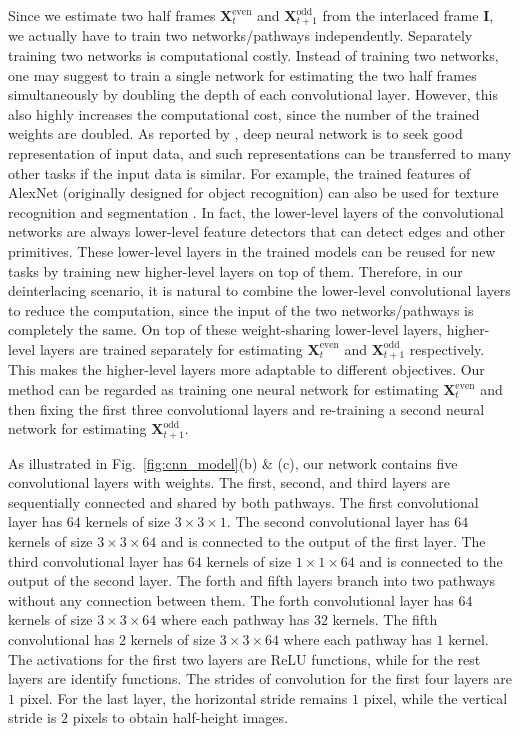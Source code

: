 \documentclass[acmtog]{acmart}
\begin{document}
Since we estimate two half frames $\mathbf{X}^{\text{even}}_t$ and
$\mathbf{X}^{\text{odd}}_{t+1}$ from the interlaced frame $\mathbf{I}$, we
actually have to train two networks/pathways independently. Separately training two
networks is computational costly. Instead of training two networks, one
may suggest to train a single network for estimating the two half frames simultaneously
by doubling the depth of each convolutional layer. However, this also
highly increases the computational cost, since the number of the trained weights
are doubled. As reported by \cite{bengio2012deep}, deep neural network is to
seek good representation of input data, and such representations can be transferred
to many other tasks if the input data is similar. For example, the trained
features of AlexNet \cite{krizhevsky2012imagenet} (originally designed for
object recognition) can also be used for texture recognition and segmentation
\cite{cimpoi2015deep}. In fact, the lower-level layers of the convolutional
networks are always lower-level feature detectors that can detect edges and other
primitives. These lower-level layers in the trained models can be reused for new
tasks by training new higher-level layers on top of them. Therefore, in our
deinterlacing scenario, it is natural to combine the lower-level convolutional
layers to reduce the computation, since the input of the two networks/pathways is
completely the same. On top of these weight-sharing lower-level layers, higher-level 
layers are trained separately for estimating $\mathbf{X}^{\text{even}}_t$
and $\mathbf{X}^{\text{odd}}_{t+1}$ respectively. This makes the 
higher-level layers more adaptable to different objectives. Our method can be regarded
as training one neural network for estimating $\mathbf{X}^{\text{even}}_t$ and
then fixing the first three convolutional layers and re-training a second neural
network for estimating $\mathbf{X}^{\text{odd}}_{t+1}$.

As illustrated in Fig.~\ref{fig:cnn_model}(b) \& (c), our network contains five convolutional layers with weights.
The first, second, and third layers are sequentially connected and shared by both pathways.
The first convolutional layer has $64$ kernels of size $3\times3\times1$.
The second convolutional layer has $64$ kernels of size $3\times3\times64$ and is connected to the output of the first layer.
The third convolutional layer has $64$ kernels of size $1\times1\times64$ and is connected to the output of the second layer.
The forth and fifth layers branch into two pathways without any connection between them.
The forth convolutional layer has $64$ kernels of size $3\times3\times64$ where each pathway has $32$ kernels.
The fifth convolutional has $2$ kernels of size $3\times3\times64$ where each pathway has $1$ kernel.
The activations for the first two layers are ReLU functions, while for the rest layers are identify functions.
The strides of convolution for the first four layers are $1$ pixel.
For the last layer, the horizontal stride remains $1$ pixel, while the vertical stride is $2$ pixels to obtain half-height images.
\end{document}
